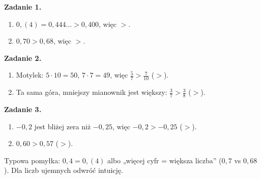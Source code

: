 \documentclass[11pt,a4paper]{article}
\begin{document}

\vspace{0.6em}
\textbf{Zadanie 1.}
\begin{enumerate}[label=\alph*), leftmargin=*, itemsep=4pt]
  \item $0{,}(4)=0{,}444\ldots>0{,}400$, więc \textbf{$>$}.
  \item $0{,}70>0{,}68$, więc \textbf{$>$}.
\end{enumerate}

\textbf{Zadanie 2.}
\begin{enumerate}[label=\alph*), leftmargin=*, itemsep=4pt]
  \item Motylek: $5\cdot 10=50$, $7\cdot 7=49$, więc $\frac{5}{7}>\frac{7}{10}$ (\textbf{$>$}).
  \item Ta sama góra, mniejszy mianownik jest większy: $\frac{3}{7}>\frac{3}{8}$ (\textbf{$>$}).
\end{enumerate}

\textbf{Zadanie 3.}
\begin{enumerate}[label=\alph*), leftmargin=*, itemsep=4pt]
  \item $-0{,}2$ jest bliżej zera niż $-0{,}25$, więc $-0{,}2>-0{,}25$ (\textbf{$>$}).
  \item $0{,}60>0{,}57$ (\textbf{$>$}).
\end{enumerate}

\vspace{0.6em}
\begin{tcolorbox}[colback=white, colframe=okres, boxrule=0.6pt, arc=2pt, title=Wskazówka dla Pawła]
Typowa pomyłka: $0{,}4=0{,}(4)$ albo „więcej cyfr = większa liczba” ($0{,}7$ vs $0{,}68$). Dla liczb ujemnych odwróć intuicję.
\end{tcolorbox}
\end{document}
